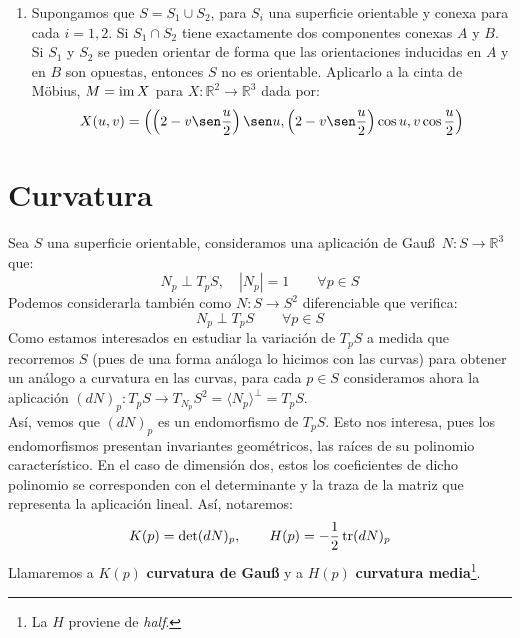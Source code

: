 \begin{ejercicio}
\begin{enumerate}
\begin{itemize}
                    obtenemos también que $N$ es una aplicación de Gau\ss\ para $S$.
            \end{itemize}
        \item Supongamos que $S=S_1\cup S_2$, para $S_i$ una superficie orientable y conexa para cada $i=1,2$. Si $S_1\cap S_2$ tiene exactamente dos componentes conexas $A$ y $B$. Si $S_1$ y $S_2$ se pueden orientar de forma que las orientaciones inducidas en $A$ y en $B$ son opuestas, entonces $S$ no es orientable. Aplicarlo a la cinta de Möbius, $M = \operatorname{im} X$ para $X:\mathbb{R}^2\to \mathbb{R}^3$ dada por:
            \begin{equation*}
                X(u,v) = \left(\left(2-v\sen \frac{u}{2}\right)\sen u,\left(2-v\sen\frac{u}{2}\right)\cos u,v\cos\frac{u}{2}\right)
            \end{equation*}
    \end{enumerate}
\end{ejercicio}

\section{Curvatura}
\noindent
Sea $S$ una superficie orientable, consideramos una aplicación de Gau\ss\ $N:S\to\mathbb{R}^3$ que:
\begin{equation*}
    N_p\perp T_pS, \quad |N_p| = 1 \qquad \forall p\in S
\end{equation*}
Podemos considerarla también como $N:S\to S^2$ diferenciable que verifica:
\begin{equation*}
    N_p\perp T_pS\qquad \forall p\in S
\end{equation*}
Como estamos interesados en estudiar la variación de $T_pS$ a medida que recorremos $S$ (pues de una forma análoga lo hicimos con las curvas) para obtener un análogo a curvatura en las curvas, para cada $p\in S$ consideramos ahora la aplicación $(dN)_p:T_pS\to T_{N_p}S^2 = \langle N_p \rangle^\perp = T_pS$.\\

\noindent
Así, vemos que $(dN)_p$ es un endomorfismo de $T_pS$. Esto nos interesa, pues los endomorfismos presentan invariantes geométricos, las raíces de su polinomio característico. En el caso de dimensión dos, estos los coeficientes de dicho polinomio se corresponden con el determinante y la traza de la matriz que representa la aplicación lineal. Así, notaremos:
\begin{equation*}
    K(p) = \det(dN)_p, \qquad H(p)=-\frac{1}{2}\operatorname{tr}(dN)_p
\end{equation*}
Llamaremos a $K(p)$ \textbf{curvatura de Gau\ss} y a $H(p)$ \textbf{curvatura media}\footnote{La $H$ proviene de \textit{half}.}.\\

